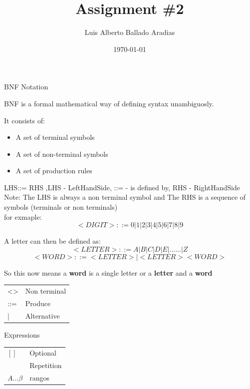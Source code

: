 \documentclass[
	12pt, %
]{fphw}
\title{Assignment \#2} %
\author{Luis Alberto Ballado Aradias} %
\date{\today} %
\institute{Centro de Investigación y de Estudios Avanzados del IPN \\ Unidad Tamaulipas} %
\begin{document}
\maketitle %

{\color{teal}
\dotfill
BNF Notation
\dotfill}

BNF is a formal mathematical way of defining syntax unambiguosly.

It consists of:
\begin{itemize}
\item A set of terminal symbols
\item A set of non-terminal symbols
\item A set of production rules
\end{itemize}

LHS::= RHS ,LHS - LeftHandSide, ::= - is defined by, RHS - RightHandSide\\

Note: The LHS is always a non terminal symbol and The RHS is a sequence of symbols (terminals or non terminals)\\

for exmaple:
\[<DIGIT>::= 0|1|2|3|4|5|6|7|8|9\]

A letter can then be defined as:
\[<LETTER>::=A|B|C|D|E|......|Z\]
\[<WORD>::=<LETTER>|<LETTER><WORD>\]

So this now means a \textbf{word} is a single letter or a \textbf{letter} and a \textbf{word}\\

\begin{table}[ht]
\begin{tabular}{l l}
<> & Non terminal\\
::= & Produce\\
| & Alternative
\end{tabular}
\end{table}

Expressions\\
\begin{table}[ht]
\begin{tabular}{l l}
$\left[\right]$ & Optional\\
{} & Repetition\\
$A \dots \beta$ & rangos
\end{tabular}
\end{table}
\end{document}
